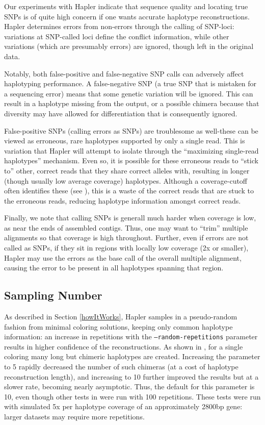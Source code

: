\documentclass[11pt]{llncs}
\begin{document}
Our experiments with Hapler indicate that sequence quality and locating true SNPs is of quite high concern if one wants accurate haplotype 
reconstructions. Hapler determines errors from non-errors through the calling of SNP-loci: variations at SNP-called loci define the conflict 
information, while other variations (which are presumably errors) are ignored, though left in the original data.

Notably, both false-positive and false-negative SNP calls can adversely affect haplotyping performance. A false-negative SNP (a true SNP that is 
mistaken for a sequencing error) means that some genetic variation will be ignored. This can result in a haplotype missing from the output, or a 
possible chimera because that diversity may have allowed for differentiation that is consequently ignored.

False-positive SNPs (calling errors as SNPs) are troublesome as well-these can be viewed as erroneous, rare haplotypes supported by only a single 
read. This is variation that Hapler will attempt to isolate through the ``maximizing single-read haplotypes'' mechanism. Even so, it is possible for 
these erroneous reads to ``stick to'' other, correct reads that they share correct alleles with, resulting in longer (though usually low average 
coverage) haplotypes. Although a coverage-cutoff often identifies these (see \cite{ONEIL2011}), this is a waste of the correct reads that are 
stuck to the erroneous reads, reducing haplotype information amongst correct reads.

Finally, we note that calling SNPs is generall much harder when coverage is low, as near the ends of assembled contigs. Thus, one may want to 
``trim'' multiple alignments so that coverage is high throughout. Further, even if errors are not called as SNPs, if they sit in regions with 
locally low coverage (2x or smaller), Hapler may use the errors as the base call of the overall multiple alignment, causing the error to be
present in all haplotypes spanning that region.

\subsection{Sampling Number}

As described in Section \ref{howItWorks}, Hapler samples in a pseudo-random fashion from minimal coloring solutions, keeping only common
haplotype information: an increase in repetitions with the \texttt{--random-repetitions} parameter results in higher confidence of the
reconstructions. As shown in \cite{ONEIL2011}, for a single coloring many long but chimeric haplotypes are created. Increasing the
parameter to 5 rapidly decreased the number of such chimeras (at a cost of haplotype reconstruction length), and increasing to 10 further
improved the results but at a slower rate, becoming nearly asymptotic. Thus, the default for this parameter is 10, even though other tests
in \cite{ONEIL2011} were run with 100 repetitions. These tests were run with simulated 5x per haplotype coverage of an approximately 2800bp
gene: larger datasets may require more repetitions.
\end{document}
